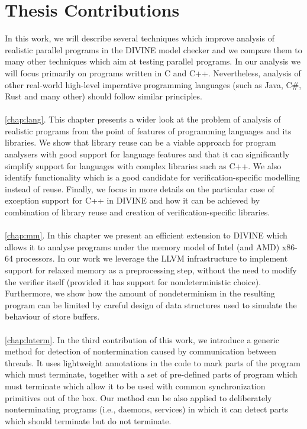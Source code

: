 \section{Thesis Contributions}

In this work, we will describe several techniques which improve analysis of realistic parallel programs in the DIVINE model checker and we compare them to many other techniques which aim at testing parallel programs.
In our analysis we will focus primarily on programs written in C and C++.
Nevertheless, analysis of other real-world high-level imperative programming
languages (such as Java, C\#, Rust and many other) should follow similar
principles.

\paragraph{}
\autoref{chap:lang}.
This chapter presents a wider look at the problem of analysis of realistic
programs from the point of features of programming languages and its libraries.
We show that library reuse can be a viable approach for program analysers with
good support for language features and that it can significantly simplify
support for languages with complex libraries such as C++.
We also identify functionality which is a good candidate for
verification-specific modelling instead of reuse.
Finally, we focus in more details on the particular case of exception support
for C++ in DIVINE and how it can be achieved by combination of library reuse
and creation of verification-specific libraries.

\paragraph{}
\autoref{chap:mm}.
In this chapter we present an efficient extension to DIVINE which allows it to
analyse programs under the memory model of Intel (and AMD) x86-64 processors.
In our work we leverage the LLVM infrastructure to implement support for
relaxed memory as a preprocessing step, without the need to modify the verifier
itself (provided it has support for nondeterministic choice).
Furthermore, we show how the amount of nondeterminism in the resulting program
can be limited by careful design of data structures used to simulate the
behaviour of \xtso store buffers.

\paragraph{}
\autoref{chap:lnterm}.
In the third contribution of this work, we introduce a generic method for
detection of nontermination caused by communication between threads.
It uses lightweight annotations in the code to mark parts of the program which
must terminate, together with a set of pre-defined parts of program which must
terminate which allow it to be used with common synchronization primitives out
of the box.
Our method can be also applied to deliberately nonterminating programs (i.e.,
daemons, services) in which it can detect parts which should terminate but do
not terminate.

